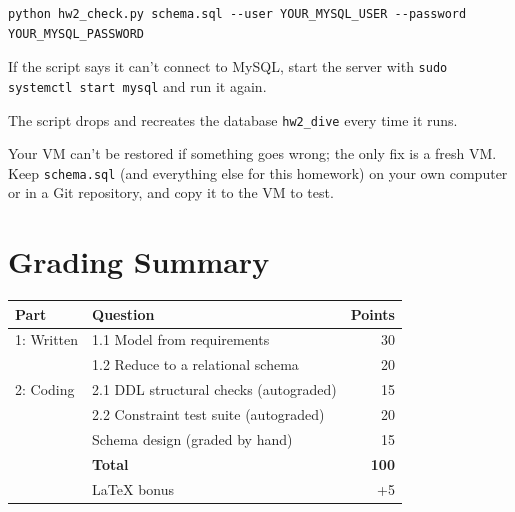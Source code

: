 \documentclass[11pt]{article}
\newcommand{\code}[1]{\texttt{#1}}
\begin{document}
\begin{lstlisting}
python hw2_check.py schema.sql --user YOUR_MYSQL_USER --password YOUR_MYSQL_PASSWORD
\end{lstlisting}

If the script says it can't connect to MySQL, start the server with
\code{sudo systemctl start mysql} and run it again.

The script drops and recreates the database \code{hw2\_dive} every time it runs.

\begin{warnbox}[title=Keep a copy off your VM]
Your VM can't be restored if something goes wrong; the only fix is a fresh VM. Keep
\code{schema.sql} (and everything else for this homework) on your own computer or in a Git
repository, and copy it to the VM to test.
\end{warnbox}

\section*{Grading Summary}

\begin{center}
\begin{tabular}{@{}llr@{}}
\toprule
\textbf{Part} & \textbf{Question} & \textbf{Points} \\
\midrule
1: Written & 1.1 Model from requirements & 30 \\
           & 1.2 Reduce to a relational schema & 20 \\
\midrule
2: Coding  & 2.1 DDL structural checks (autograded) & 15 \\
           & 2.2 Constraint test suite (autograded) & 20 \\
           & Schema design (graded by hand) & 15 \\
\midrule
           & \textbf{Total} & \textbf{100} \\
           & LaTeX bonus & +5 \\
\bottomrule
\end{tabular}
\end{center}
\end{document}
